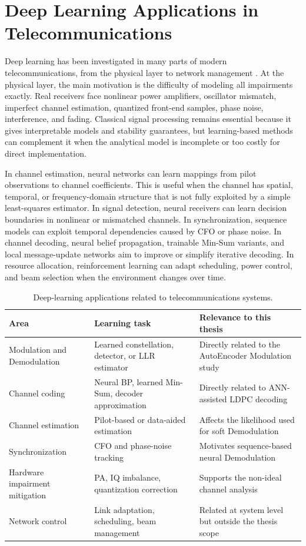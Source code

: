 \section{Deep Learning Applications in Telecommunications}
Deep learning has been investigated in many parts of modern telecommunications, from the physical layer to network management \cite{oshea2017,cammerer2020}. At the physical layer, the main motivation is the difficulty of modeling all impairments exactly. Real receivers face nonlinear power amplifiers, oscillator mismatch, imperfect channel estimation, quantized front-end samples, phase noise, interference, and fading. Classical signal processing remains essential because it gives interpretable models and stability guarantees, but learning-based methods can complement it when the analytical model is incomplete or too costly for direct implementation.

In channel estimation, neural networks can learn mappings from pilot observations to channel coefficients. This is useful when the channel has spatial, temporal, or frequency-domain structure that is not fully exploited by a simple least-squares estimator. In signal detection, neural receivers can learn decision boundaries in nonlinear or mismatched channels. In synchronization, sequence models can exploit temporal dependencies caused by CFO or phase noise. In channel decoding, neural belief propagation, trainable Min-Sum variants, and local message-update networks aim to improve or simplify iterative decoding. In resource allocation, reinforcement learning can adapt scheduling, power control, and beam selection when the environment changes over time.

\begin{table}[H]
\centering
\caption{Deep-learning applications related to telecommunications systems.}
\label{tab:dl_telecom_applications}
\begin{tabularx}{\textwidth}{>{\raggedright\arraybackslash}p{}>{\raggedright\arraybackslash}p{}>{\raggedright\arraybackslash}X}
\toprule
Area & Learning task & Relevance to this thesis\\
\midrule
Modulation and Demodulation & Learned constellation, detector, or LLR estimator & Directly related to the AutoEncoder Modulation study\\
Channel coding & Neural BP, learned Min-Sum, decoder approximation & Directly related to ANN-assisted LDPC decoding\\
Channel estimation & Pilot-based or data-aided estimation & Affects the likelihood used for soft Demodulation\\
Synchronization & CFO and phase-noise tracking & Motivates sequence-based neural Demodulation\\
Hardware impairment mitigation & PA, IQ imbalance, quantization correction & Supports the non-ideal channel analysis\\
Network control & Link adaptation, scheduling, beam management & Related at system level but outside the thesis scope\\
\bottomrule
\end{tabularx}
\end{table}

